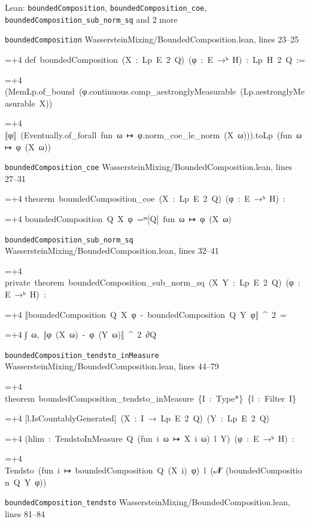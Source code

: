 \documentclass[11pt,a4paper]{article}
\newlength{\leancharwidth}
\newenvironment{leancode}{\par\smallskip\begingroup\ttfamily\footnotesize\raggedright
  \settowidth{\leancharwidth}{M}\setlength{\parskip}{0pt}\setlength{\parindent}{0pt}
  \frenchspacing}{\par\endgroup\smallskip}
\newcommand{\leanline}[2]{\hangindent=\dimexpr#1\leancharwidth+4\leancharwidth\relax
  \hangafter=1\noindent\hspace*{#1\leancharwidth}#2\par}
\newcommand{\leansource}[1]{\par{\footnotesize\color{leanmuted}#1}\par}
\begin{document}
\begin{leanbox}{Lean: \texttt{boundedComposition}, \texttt{boundedComposition\_\allowbreak{}coe}, \texttt{boundedComposition\_\allowbreak{}sub\_\allowbreak{}norm\_\allowbreak{}sq} and 2 more}
\leansource{\texttt{boundedComposition} \quad WassersteinMixing/\allowbreak{}BoundedComposition.lean, lines 23–25}
\begin{leancode}
\leanline{0}{def\ boundedComposition\ (X\ :\ Lp\ E\ 2\ Q)\ (φ\ :\ E\ →ᵇ\ H)\ :\ Lp\ H\ 2\ Q\ :=}
\leanline{2}{(MemLp.of\_bound\ (φ.continuous.comp\_aestronglyMeasurable\ (Lp.aestronglyMeasurable\ X))}
\leanline{4}{‖φ‖\ (Eventually.of\_forall\ fun\ ω\ ↦\ φ.norm\_coe\_le\_norm\ (X\ ω))).toLp\ (fun\ ω\ ↦\ φ\ (X\ ω))}
\end{leancode}
\leansource{\texttt{boundedComposition\_\allowbreak{}coe} \quad WassersteinMixing/\allowbreak{}BoundedComposition.lean, lines 27–31}
\begin{leancode}
\leanline{0}{theorem\ boundedComposition\_coe\ (X\ :\ Lp\ E\ 2\ Q)\ (φ\ :\ E\ →ᵇ\ H)\ :}
\leanline{4}{boundedComposition\ Q\ X\ φ\ =ᵐ[Q]\ fun\ ω\ ↦\ φ\ (X\ ω)}
\end{leancode}
\leansource{\texttt{boundedComposition\_\allowbreak{}sub\_\allowbreak{}norm\_\allowbreak{}sq} \quad WassersteinMixing/\allowbreak{}BoundedComposition.lean, lines 32–41}
\begin{leancode}
\leanline{0}{private\ theorem\ boundedComposition\_sub\_norm\_sq\ (X\ Y\ :\ Lp\ E\ 2\ Q)\ (φ\ :\ E\ →ᵇ\ H)\ :}
\leanline{4}{‖boundedComposition\ Q\ X\ φ\ -\ boundedComposition\ Q\ Y\ φ‖\ \textasciicircum{}\ 2\ =}
\leanline{6}{∫\ ω,\ ‖φ\ (X\ ω)\ -\ φ\ (Y\ ω)‖\ \textasciicircum{}\ 2\ ∂Q}
\end{leancode}
\leansource{\texttt{boundedComposition\_\allowbreak{}tendsto\_\allowbreak{}inMeasure} \quad WassersteinMixing/\allowbreak{}BoundedComposition.lean, lines 44–79}
\begin{leancode}
\leanline{0}{theorem\ boundedComposition\_tendsto\_inMeasure\ \{I\ :\ Type*\}\ \{l\ :\ Filter\ I\}}
\leanline{4}{[l.IsCountablyGenerated]\ (X\ :\ I\ →\ Lp\ E\ 2\ Q)\ (Y\ :\ Lp\ E\ 2\ Q)}
\leanline{4}{(hlim\ :\ TendstoInMeasure\ Q\ (fun\ i\ ω\ ↦\ X\ i\ ω)\ l\ Y)\ (φ\ :\ E\ →ᵇ\ H)\ :}
\leanline{4}{Tendsto\ (fun\ i\ ↦\ boundedComposition\ Q\ (X\ i)\ φ)\ l\ ({\leanfallback 𝓝}\ (boundedComposition\ Q\ Y\ φ))}
\end{leancode}
\leansource{\texttt{boundedComposition\_\allowbreak{}tendsto} \quad WassersteinMixing/\allowbreak{}BoundedComposition.lean, lines 81–84}
\begin{leancode}

\end{leancode}
\end{leanbox}
\end{document}
